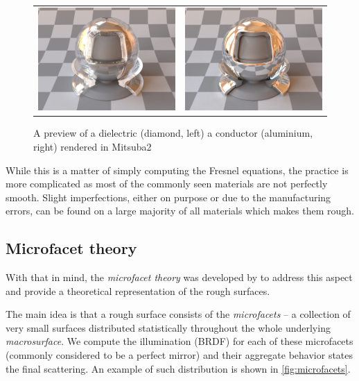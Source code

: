 \begin{figure}[httpb]
	\centering
	\begin{tabular}{cc}
		\includegraphics[width=.4\linewidth]{img/dielectric_diamond.jpg}
		&
		\includegraphics[width=.4\linewidth]{img/conductor_aluminium.jpg}
	\end{tabular}
	\caption{A preview of a dielectric (diamond, left) a  conductor (aluminium, right) rendered in Mitsuba2~\cite{mitsubaWeb}}
	\label{fig:compare_dielectric_conductor}
\end{figure}

While this is a matter of simply computing the Fresnel equations, the practice is more complicated as most of the commonly seen materials are not perfectly smooth. Slight imperfections, either on purpose or due to the manufacturing errors, can be found on a large majority of all materials which makes them rough.

\subsection{Microfacet theory}
With that in mind, the \emph{microfacet theory} was developed by \citet{cook1982reflectance} to address this aspect and provide a theoretical representation of the rough surfaces.

The main idea is that a rough surface consists of the \emph{microfacets} -- a collection of very small surfaces distributed statistically throughout the whole underlying \emph{macrosurface}. We compute the illumination (BRDF) for each of these microfacets (commonly considered to be a perfect mirror) and their aggregate behavior states the final scattering. An example of such distribution is shown in \autoref{fig:microfacets}.

